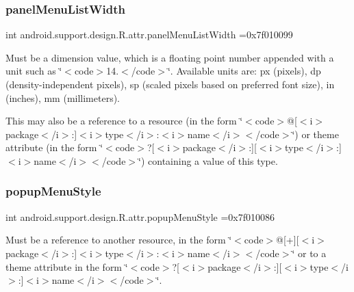 \subsubsection{\texorpdfstring{panel\+Menu\+List\+Width}{panelMenuListWidth}}
{\footnotesize\ttfamily int android.\+support.\+design.\+R.\+attr.\+panel\+Menu\+List\+Width =0x7f010099\hspace{0.3cm}{\ttfamily [static]}}

Must be a dimension value, which is a floating point number appended with a unit such as \char`\"{}$<$code$>$14.\+5sp$<$/code$>$\char`\"{}. Available units are\+: px (pixels), dp (density-\/independent pixels), sp (scaled pixels based on preferred font size), in (inches), mm (millimeters). 

This may also be a reference to a resource (in the form \char`\"{}$<$code$>$@\mbox{[}$<$i$>$package$<$/i$>$\+:\mbox{]}$<$i$>$type$<$/i$>$\+:$<$i$>$name$<$/i$>$$<$/code$>$\char`\"{}) or theme attribute (in the form \char`\"{}$<$code$>$?\mbox{[}$<$i$>$package$<$/i$>$\+:\mbox{]}\mbox{[}$<$i$>$type$<$/i$>$\+:\mbox{]}$<$i$>$name$<$/i$>$$<$/code$>$\char`\"{}) containing a value of this type. \mbox{\label{classandroid_1_1support_1_1design_1_1R_1_1attr_a390433602092ab37564f0a189f9099a0}} 
\subsubsection{\texorpdfstring{popup\+Menu\+Style}{popupMenuStyle}}
{\footnotesize\ttfamily int android.\+support.\+design.\+R.\+attr.\+popup\+Menu\+Style =0x7f010086\hspace{0.3cm}{\ttfamily [static]}}

Must be a reference to another resource, in the form \char`\"{}$<$code$>$@\mbox{[}+\mbox{]}\mbox{[}$<$i$>$package$<$/i$>$\+:\mbox{]}$<$i$>$type$<$/i$>$\+:$<$i$>$name$<$/i$>$$<$/code$>$\char`\"{} or to a theme attribute in the form \char`\"{}$<$code$>$?\mbox{[}$<$i$>$package$<$/i$>$\+:\mbox{]}\mbox{[}$<$i$>$type$<$/i$>$\+:\mbox{]}$<$i$>$name$<$/i$>$$<$/code$>$\char`\"{}. \mbox{\label{classandroid_1_1support_1_1design_1_1R_1_1attr_a31e4e569ed674c1af7374b723ea84669}} 
